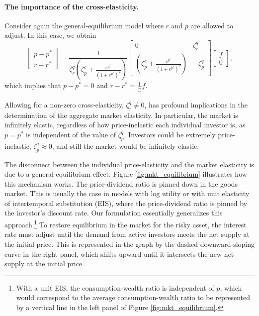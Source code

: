 \paragraph{The importance of the cross-elasticity.} Consider again the general-equilibrium model where $r$ and $p$ are allowed to adjust. In this case, we obtain
\begin{equation}
      \left[ 
    \begin{matrix}
        p-p^*\\
        r-r^*
    \end{matrix}
    \right] = \frac{1}{\zeta_r^q(\zeta_p^c + \frac{e^{p^*}}{(1+e^{p^*})^2})} \left[\begin{matrix}
        0 & \zeta_r^q\\
        \left(\zeta_p^c +\frac{e^{p^*}}{(1+e^{p^*})^2}\right) & -\zeta^q_p
    \end{matrix}\right]
     \left[ 
    \begin{matrix}
        f\\
        0
    \end{matrix}
    \right],
\end{equation}
which implies that $p - p^* =  0$ and $r - r^* = \frac{1}{\zeta_r^q} f$.

Allowing for a non-zero cross-elasticity, $\zeta_{r}^q \neq 0$, has profound implications in the determination of the aggregate market elasticity. 
In particular, the market is infinitely elastic, regardless of how price-inelastic each individual investor is, as 
$p = p^*$ is independent of the value of $\zeta^q_p$. Investors could be extremely price-inelastic, $\zeta_p^q \approx 0$, and still the market would be infinitely elastic. 

The disconnect between the individual price-elasticity and the market elasticity is due to a general-equilibrium effect.
Figure \ref{fig:mkt_equilibrium} illustrates how this mechanism works. 
The price-dividend ratio is pinned down in the goods market. 
This is usually the case in models with log utility or with unit elasticity of intertemporal substitution (EIS), where the price-dividend ratio is pinned by the investor's discount rate. 
Our formulation essentially generalizes this approach.\footnote{With a unit EIS, the consumption-wealth ratio is independent of $p$, which would correspond to the average consumption-wealth ratio to be represented by a vertical line in the left panel of Figure \ref{fig:mkt_equilibrium}.} To restore equilibrium in the market for the risky asset, the interest rate must adjust until the demand from active investors meets the net supply at the initial price. 
This is represented in the graph by the dashed downward-sloping curve in the right panel, which shifts upward until it intersects the new net supply at the initial price.

